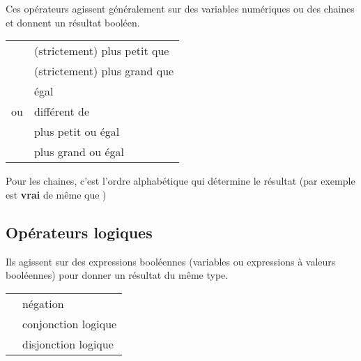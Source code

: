 			Ces opérateurs agissent généralement sur des variables numériques ou des
			chaines et donnent un résultat booléen.
	
			\begin{center}
			\tablehead{}
			\begin{supertabular}{m{2cm}|m{11cm}}
			\raggedleft  \textstyleCodeInsr{\textless} & (strictement) plus petit que\\
			\raggedleft  \textstyleCodeInsr{\textgreater} & (strictement) plus grand que\\
			\raggedleft  \textstyleCodeInsr{=} & égal\\
			\raggedleft  \textstyleCodeInsr{{\textless}{\textgreater}}
				ou \textstyleCodeInsr{${\neq}$} &  différent de\\
			\raggedleft  \textstyleCodeInsr{${\leq}$} & plus petit ou égal\\
			\raggedleft  \textstyleCodeInsr{${\geq}$} & plus grand ou égal\\
			\end{supertabular}
			\end{center}
	
			Pour les chaines, c'est l’ordre alphabétique qui
			détermine le résultat (par exemple
			 est \textbf{vrai} de même que
			\textstyleCodeInsr{${\leq}$})
			
	
		\subsection{Opérateurs logiques}
	
			Ils agissent sur des expressions booléennes (variables ou expressions à
			valeurs booléennes) pour donner un résultat du même type.
	
			\begin{center}
			\tablehead{}
			\begin{supertabular}{m{1cm}|m{12cm}}
			\raggedleft  {} & négation\\
			\raggedleft  {} & conjonction logique\\
			\raggedleft  {} & disjonction logique\\
			\end{supertabular}
			\end{center}
	
